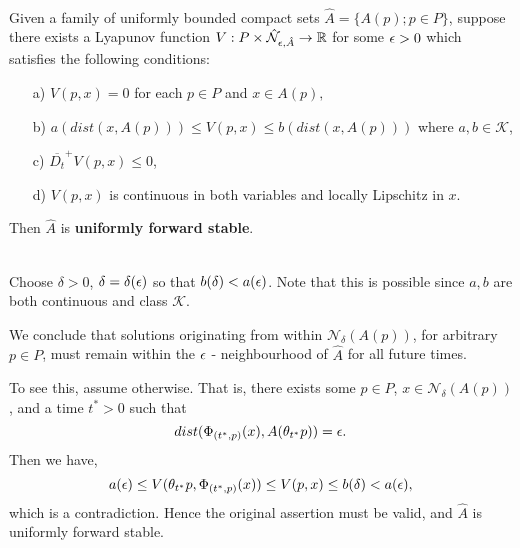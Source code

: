 \begin{therm} \hfill \\
\label{ufsthm}
  Given a family of uniformly bounded compact sets $\hat{A} = \{A(p);p
  \in P \}$, suppose there exists a Lyapunov function $V: P \times
  \hat{\mathcal{N}}_{\epsilon, \hat{A}} \to \mathbb{R}$ for some $\epsilon > 0$ which
  satisfies the following conditions:
\begin{itemize}
  \item[a)] $V(p, x) = 0$ for each $p \in P$ and $x \in A(p),$
  \item[b)] $a(dist( x, A(p))) \leq V(p, x) \leq b( dist( x, A(p)))$
    where $a, b \in \mathcal{K}$,
  \item[c)] $\overline{D_t}^+ V(p, x) \leq 0$,
  \item[d)] $V(p, x)$ is continuous in both variables and locally Lipschitz in
    $x$.
\end{itemize}
Then $\hat{A}$ is \textbf{uniformly forward stable}.
\end{therm}
\begin{prf} \hfill \\
  Choose $\delta > 0$, $\delta = \delta(\epsilon)$ so that $b(\delta) < a(\epsilon)$. Note
  that this is possible since $a, b$ are both continuous and class
  $\mathcal{K}$.

  We conclude that solutions originating from within
  $\mathcal{N}_{\delta}(A(p))$, for arbitrary $p \in P$, must remain within the
  $\epsilon$ - neighbourhood of $\hat{A}$ for all future times.

To see this, assume otherwise. That is, there exists some $p
\in   P$, $x \in   \mathcal{N}_{\delta}(A(p))$, and a time $t^*>0$ such that
  \[ dist( \Phi_{(t^*, p)}(x), A(\theta_{t^*}p) ) = \epsilon. \]
  Then we have,
  \[ a(\epsilon) \leq V(\theta_{t^*}p, \Phi_{(t^*, p)}(x)) \leq V(p, x) \leq b(\delta)
               < a(\epsilon), \]
  which is a contradiction. Hence the original assertion must be valid, and
  $\hat{A}$ is uniformly forward stable.
\end{prf}

